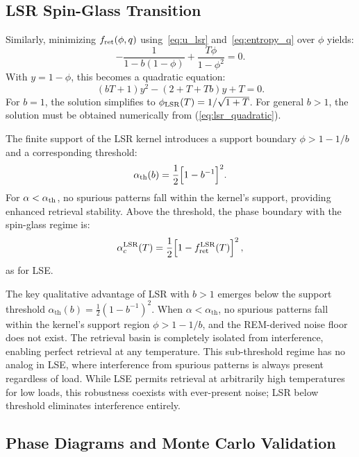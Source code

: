 \documentclass{article}
\theoremstyle{plain}
\theoremstyle{definition}
\theoremstyle{remark}
\begin{document}
\subsection{LSR Spin-Glass Transition}

Similarly, minimizing $f_{\rm ret}(\phi, q)$ using~\eqref{eq:u_lsr} and~\eqref{eq:entropy_q} over $\phi$ yields:
\begin{equation}
    -\frac{1}{1 - b(1-\phi)} + \frac{T\phi}{1-\phi^2} = 0.
\end{equation}
With $y = 1 - \phi$, this becomes a quadratic equation:
\begin{equation}
    (bT + 1)y^2 - (2 + T + Tb)y + T = 0.
    \label{eq:lsr_quadratic}
\end{equation}
For $b = 1$, the solution simplifies to $\phi_{\rm LSR}(T) = 1/\sqrt{1+T}$. For general $b > 1$, the solution must be obtained numerically from (\ref{eq:lsr_quadratic}).

The finite support of the LSR kernel introduces a support boundary $\phi > 1 - 1/b$ and a corresponding threshold:
\begin{equation}
    \alpha_{\rm th}(b) = \frac{1}{2}\Big[1 - b^{-1}\Big]^2.
\end{equation}
For $\alpha < \alpha_{\rm th}$, no spurious patterns fall within the kernel's support, providing enhanced retrieval stability. Above the threshold, the phase boundary with the spin-glass regime is:
\begin{equation}
    \alpha_c^{\rm LSR}(T) = \frac{1}{2} \Big[1 - f_{\rm ret}^{\rm LSR}(T) \Big]^2\,,
    \label{eq:alpha_lsr}
\end{equation}
as for LSE.

The key qualitative advantage of LSR with $b > 1$ emerges below the support threshold $\alpha_{\text{th}}(b) = \frac{1}{2}(1 - b^{-1})^2$. When $\alpha < \alpha_{\text{th}}$, no spurious patterns fall within the kernel's support region $\phi > 1 - 1/b$, and the REM-derived noise floor does not exist. The retrieval basin is completely isolated from interference, enabling perfect retrieval at any temperature. This sub-threshold regime has no analog in LSE, where interference from spurious patterns is always present regardless of load. While LSE permits retrieval at arbitrarily high temperatures for low loads, this robustness coexists with ever-present noise; LSR below threshold eliminates interference entirely.


\subsection{Phase Diagrams and Monte Carlo Validation}
\end{document}

